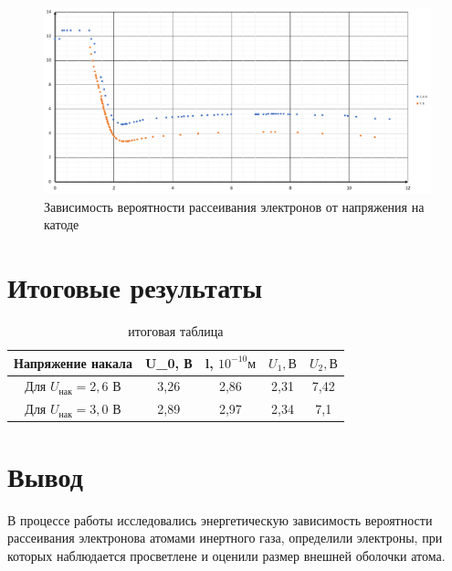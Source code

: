 \documentclass[a4paper,14pt]{extarticle}
\begin{document}
	\begin{figure}[h!]
		\centering
		\includegraphics[width = \paperwidth]{graph_2_513}
		\caption{Зависимость вероятности рассеивания электронов от напряжения на катоде}
	\end{figure}
	\clearpage
	\section{Итоговые результаты} %
	\label{sec:итоговые_результаты}
	\begin{table}[h!]
		\centering
		\caption{итоговая таблица}
		\begin{tabular}{|c|c|c|c|c|}
			\hline
			Напряжение накала & U_0, В& l, $10^{-10}м$&$U_1, В$ & $U_2, В$ \\ \hline
			Для $U_{нак}=2,6$ В& 3,26& 2,86& 2,31&7,42\\ \hline
			Для $U_{нак}=3,0$ В& 2,89& 2,97& 2,34&7,1 \\ \hline
		\end{tabular}
		
	\end{table}

	\section{Вывод} %
	\label{sec:вывод}
	В процессе работы исследовались энергетическую зависимость вероятности рассеивания электронова атомами инертного газа, определили электроны, при которых наблюдается просветлене и оценили размер внешней оболочки атома.
\end{document}
